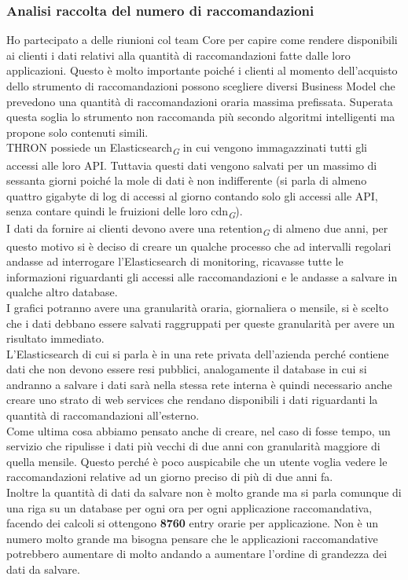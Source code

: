 \documentclass[a4paper, 12pt, twoside, openright]{book}
\newcommand{\gloss}[1]{#1\textsubscript{\textit{\tiny{G}}}}
\begin{document}
\subsubsection{Analisi raccolta del numero di raccomandazioni}
Ho partecipato a delle riunioni col team Core per capire come rendere disponibili ai clienti i dati relativi alla quantità di raccomandazioni fatte dalle loro applicazioni. Questo è molto importante poiché i clienti al momento dell'acquisto dello strumento di raccomandazioni possono scegliere diversi Business Model che prevedono una quantità di raccomandazioni oraria massima prefissata. Superata questa soglia lo strumento non raccomanda più secondo algoritmi intelligenti ma propone solo contenuti simili.\\
THRON possiede un \gloss{Elasticsearch} in cui vengono immagazzinati tutti gli accessi alle loro API. Tuttavia questi dati vengono salvati per un massimo di sessanta giorni poiché la mole di dati è non indifferente (si parla di almeno quattro gigabyte di log di accessi al giorno contando solo gli accessi alle API, senza contare quindi le fruizioni delle loro \gloss{cdn}).\\
I dati da fornire ai clienti devono avere una \gloss{retention} di almeno due anni, per questo motivo si è deciso di creare un qualche processo che ad intervalli regolari andasse ad interrogare l'Elasticsearch di monitoring, ricavasse tutte le informazioni riguardanti gli accessi alle raccomandazioni e le andasse a salvare in qualche altro database.\\
I grafici potranno avere una granularità oraria, giornaliera o mensile, si è scelto che i dati debbano essere salvati raggruppati per queste granularità per avere un risultato immediato.\\
L'Elasticsearch di cui si parla è in una rete privata dell'azienda perché contiene dati che non devono essere resi pubblici, analogamente il database in cui si andranno a salvare i dati sarà nella stessa rete interna è quindi necessario anche creare uno strato di web services che rendano disponibili i dati riguardanti la quantità di raccomandazioni all'esterno.\\
Come ultima cosa abbiamo pensato anche di creare, nel caso di fosse tempo, un servizio che ripulisse i dati più vecchi di due anni con granularità maggiore di quella mensile. Questo perché è poco auspicabile che un utente voglia vedere le raccomandazioni relative ad un giorno preciso di più di due anni fa.\\
Inoltre la quantità di dati da salvare non è molto grande ma si parla comunque di una riga su un database per ogni ora per ogni applicazione raccomandativa, facendo dei calcoli si ottengono \textbf{8760} entry orarie per applicazione. Non è un numero molto grande ma bisogna pensare che le applicazioni raccomandative potrebbero aumentare di molto andando a aumentare l'ordine di grandezza dei dati da salvare.\\
\end{document}
